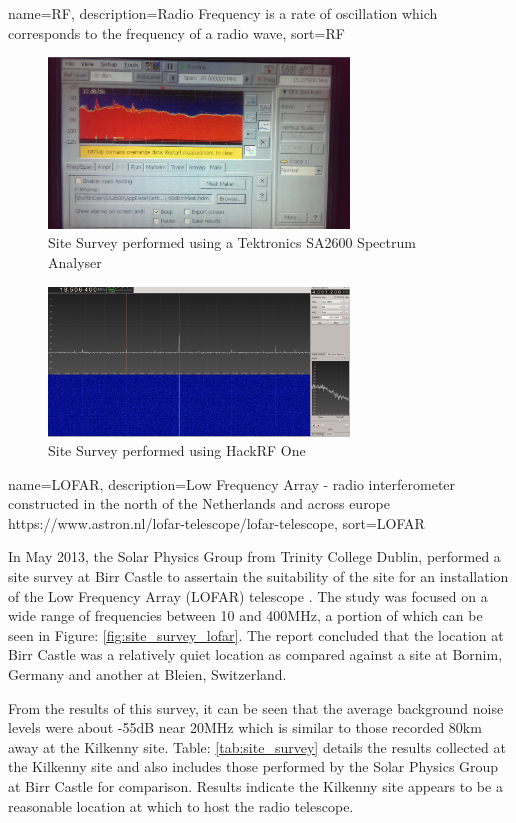 \documentclass[runningheads,a4paper]{llncs}
\begin{document}
{
  name={RF},
  description={Radio Frequency is a rate of oscillation which corresponds to the frequency of a radio wave},
  sort=RF
}

%
\begin{figure}[here]
\centering
\includegraphics[width=8cm]{images/26}
\caption{Site Survey performed using a Tektronics SA2600 Spectrum Analyser}
\label{fig:site_survey_spec_analyser}
\end{figure}
%

%
\begin{figure}[here]
\centering
\includegraphics[width=8cm]{images/31}
\caption{Site Survey performed using HackRF One}
\label{fig:site_survey_hackrf}
\end{figure}
%

{
  name={LOFAR},
  description={Low Frequency Array - radio interferometer constructed in the north of the Netherlands and across europe https://www.astron.nl/lofar-telescope/lofar-telescope},
  sort=LOFAR
}

In May 2013, the Solar Physics Group from Trinity College Dublin, performed a site survey at Birr Castle to assertain the suitability of the site for an installation of the Low Frequency Array (\gls{LOFAR}) telescope \citep{craf-13}. The study was focused on a wide range of frequencies between 10 and 400MHz, a portion of which can be seen in Figure: \ref{fig:site_survey_lofar}. The report concluded that the location at Birr Castle was a relatively quiet location as compared against a site at Bornim, Germany and another at Bleien, Switzerland. 

From the results of this survey, it can be seen that the average background noise levels were about -55dB near 20MHz which is similar to those recorded 80km away at the Kilkenny site. Table: \ref{tab:site_survey} details the results collected at the Kilkenny site and also includes those performed by the Solar Physics Group at Birr Castle for comparison. Results indicate the Kilkenny site appears to be a reasonable location at which to host the radio telescope.
\end{document}
